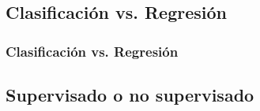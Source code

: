 \documentclass[10pt]{beamer}
\begin{document}
\subsection{Clasificaci\'on vs. Regresi\'on}

\begin{frame}
	\frametitle{Clasificaci\'on vs. Regresi\'on}
		\begin{figure}[htbp]
		\centering
		\qquad\quad
	\end{figure}
	
\end{frame}

\subsection{Supervisado o no supervisado}
\end{document}
